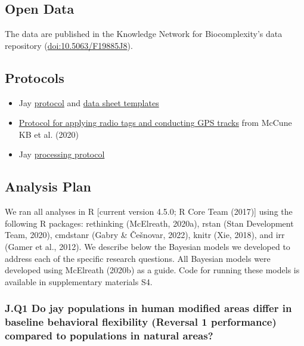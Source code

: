 \documentclass[
]{article}
\providecommand{\tightlist}{%
  \setlength{\itemsep}{0pt}\setlength{\parskip}{0pt}}
\begin{document}
\subsection{Open Data}\label{open-data}

The data are published in the Knowledge Network for Biocomplexity's data
repository (\url{doi:10.5063/F19885J8}).

\subsection{Protocols}\label{protocols}

\begin{itemize}
\tightlist
\item
  Jay
  \href{https://docs.google.com/document/d/1VWL7AIDB-Z1vhs1dEM7JACHuvNjgjZCBI3ubQECqm2U/edit?usp=sharing}{protocol}
  and
  \href{https://docs.google.com/spreadsheets/d/1qpukS67A8IslPxP8RBpdB4fS4f9ofWCvQXVgXu-G7Qs/edit?usp=sharing}{data
  sheet templates}
\item
  \href{https://docs.google.com/document/d/1ZOpkdxy5-wiGg7hYod-XaaBoOl53DsVQ3pwWoIdvrzk/edit?usp=sharing}{Protocol
  for applying radio tags and conducting GPS tracks} from McCune KB et
  al. (2020)
\item
  Jay
  \href{https://docs.google.com/document/d/1YnGdsU-Q7kNBVT-N3x1BA30xP10jPFYEv9-dlTw2RcQ/edit?usp=sharing}{processing
  protocol}
\end{itemize}

\subsection{Analysis Plan}\label{analysis-plan}

We ran all analyses in R {[}current version 4.5.0; R Core Team (2017){]}
using the following R packages: rethinking (McElreath, 2020a), rstan
(Stan Development Team, 2020), cmdstanr (Gabry \& Češnovar, 2022), knitr
(Xie, 2018), and irr (Gamer et al., 2012). We describe below the
Bayesian models we developed to address each of the specific research
questions. All Bayesian models were developed using McElreath (2020b) as
a guide. Code for running these models is available in supplementary
materials S4.

\subsubsection{J.Q1 Do jay populations in human modified areas differ in
baseline behavioral flexibility (Reversal 1 performance) compared to
populations in natural
areas?}\label{j.q1-do-jay-populations-in-human-modified-areas-differ-in-baseline-behavioral-flexibility-reversal-1-performance-compared-to-populations-in-natural-areas}
\end{document}
